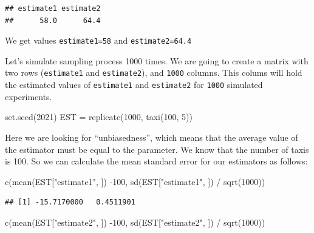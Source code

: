 \documentclass[
]{book}
\newenvironment{Shaded}{\begin{snugshade}}{\end{snugshade}}
\newcommand{\DecValTok}[1]{\textcolor[rgb]{0.00,0.00,0.81}{#1}}
\newcommand{\FunctionTok}[1]{\textcolor[rgb]{0.00,0.00,0.00}{#1}}
\newcommand{\NormalTok}[1]{#1}
\newcommand{\OtherTok}[1]{\textcolor[rgb]{0.56,0.35,0.01}{#1}}
\newcommand{\SpecialCharTok}[1]{\textcolor[rgb]{0.00,0.00,0.00}{#1}}
\newcommand{\StringTok}[1]{\textcolor[rgb]{0.31,0.60,0.02}{#1}}
\begin{document}
\begin{verbatim}
## estimate1 estimate2 
##      58.0      64.4
\end{verbatim}

We get values \texttt{estimate1=58} and \texttt{estimate2=64.4}

Let's simulate sampling process 1000 times. We are going to create a matrix with two rows (\texttt{estimate1} and \texttt{estimate2}), and \texttt{1000} columns. This colums will hold the estimated values of \texttt{estimate1} and \texttt{estimate2} for \texttt{1000} simulated experiments.

\begin{Shaded}
\begin{Highlighting}[]
\FunctionTok{set.seed}\NormalTok{(}\DecValTok{2021}\NormalTok{)}
\NormalTok{EST }\OtherTok{=} \FunctionTok{replicate}\NormalTok{(}\DecValTok{1000}\NormalTok{, }\FunctionTok{taxi}\NormalTok{(}\DecValTok{100}\NormalTok{, }\DecValTok{5}\NormalTok{))}
\end{Highlighting}
\end{Shaded}

Here we are looking for ``unbiasedness'', which means that the average value of the estimator must be equal to the parameter. We know that the number of taxis is 100. So we can calculate the mean standard error for our estimators as follows:

\begin{Shaded}
\begin{Highlighting}[]
\FunctionTok{c}\NormalTok{(}\FunctionTok{mean}\NormalTok{(EST[}\StringTok{"estimate1"}\NormalTok{, ]) }\SpecialCharTok{{-}}\DecValTok{100}\NormalTok{, }\FunctionTok{sd}\NormalTok{(EST[}\StringTok{"estimate1"}\NormalTok{, ]) }\SpecialCharTok{/} \FunctionTok{sqrt}\NormalTok{(}\DecValTok{1000}\NormalTok{))}
\end{Highlighting}
\end{Shaded}

\begin{verbatim}
## [1] -15.7170000   0.4511901
\end{verbatim}

\begin{Shaded}
\begin{Highlighting}[]
\FunctionTok{c}\NormalTok{(}\FunctionTok{mean}\NormalTok{(EST[}\StringTok{"estimate2"}\NormalTok{, ]) }\SpecialCharTok{{-}}\DecValTok{100}\NormalTok{, }\FunctionTok{sd}\NormalTok{(EST[}\StringTok{"estimate2"}\NormalTok{, ]) }\SpecialCharTok{/} \FunctionTok{sqrt}\NormalTok{(}\DecValTok{1000}\NormalTok{))}
\end{Highlighting}
\end{Shaded}
\end{document}
